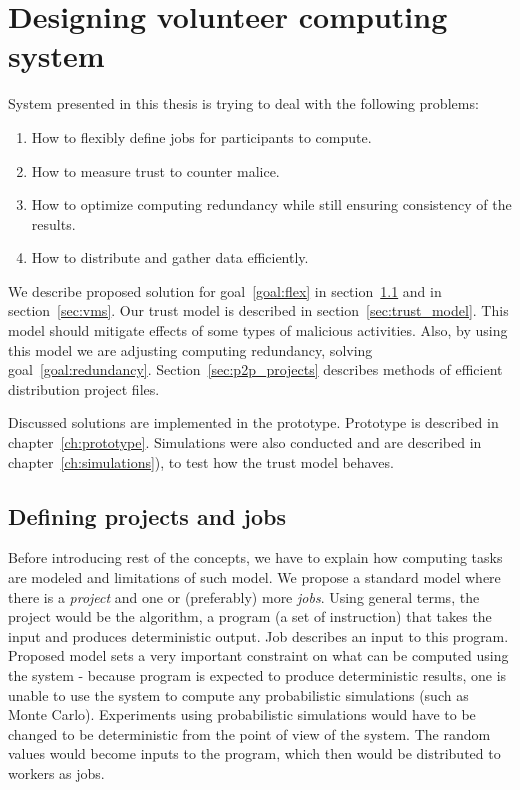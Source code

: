 \chapter{Designing volunteer computing system}

System presented in this thesis is trying to deal with the following problems:
\begin{enumerate}
\item \label{goal:flex} How to flexibly define jobs for participants to compute.
\item \label{goal:malice} How to measure trust to counter malice.
\item \label{goal:redundancy} How to optimize computing redundancy while still ensuring consistency of the results.
\item \label{goal:efficient} How to distribute and gather data efficiently.
\end{enumerate}

We describe proposed solution for goal~\ref{goal:flex} in section~\ref{sec:defining_projects} and in section~\ref{sec:vms}. Our trust model is described in section~\ref{sec:trust_model}. This model should mitigate effects of some types of malicious activities. Also, by using this model we are adjusting computing redundancy, solving goal~\ref{goal:redundancy}. Section~\ref{sec:p2p_projects} describes methods of efficient distribution project files.

Discussed solutions are implemented in the prototype. Prototype is described in chapter~\ref{ch:prototype}. Simulations were also conducted and are described in chapter~\ref{ch:simulations}), to test how the trust model behaves.

\section{Defining projects and jobs}
\label{sec:defining_projects}

Before introducing rest of the concepts, we have to explain how computing tasks are modeled and limitations of such model. We propose a standard model where there is a \emph{project} and one or (preferably) more \emph{jobs}. Using general terms, the project would be the algorithm, a program (a set of instruction) that takes the input and produces deterministic output. Job describes an input to this program. Proposed model sets a very important constraint on what can be computed using the system - because program is expected to produce deterministic results, one is unable to use the system to compute any probabilistic simulations (such as Monte Carlo). Experiments using probabilistic simulations would have to be changed to be deterministic from the point of view of the system. The random values would become inputs to the program, which then would be distributed to workers as jobs.

